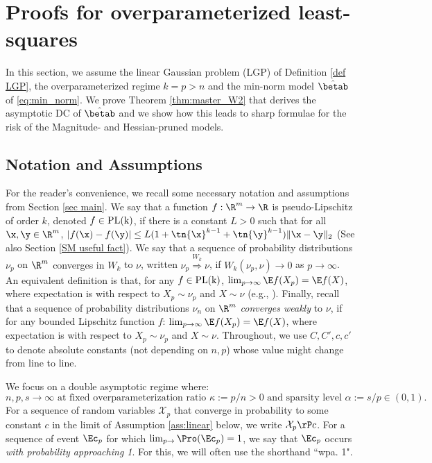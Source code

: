 
\section{Proofs for overparameterized least-squares}\label{sec proof thm 1}
In this section, we assume the linear Gaussian problem (LGP) of Definition \ref{def LGP}, the overparameterized regime $k=p>n$ and the min-norm model $\hat\betab$ of \eqref{eq:min_norm}. We prove Theorem \ref{thm:master_W2} that derives the asymptotic DC of $\hat\betab$ and we show how this leads to sharp formulae for the risk of the Magnitude- and Hessian-pruned models.


\subsection{Notation and Assumptions}\label{sec:ass_app}
For the reader's convenience, we recall some necessary notation and assumptions from Section \ref{sec main}.  We say that a function $f:\R^m\rightarrow\R$ is pseudo-Lipschitz of order $k$, denoted $f\in\rm{PL}(k)$, if there is a constant $L>0$ such that for all $\x,\y\in\R^m$,
$
|f(\x) - f(\y)|\leq L(1+\tn{\x}^{k-1}+\tn{\y}^{k-1})\|\x-\y\|_2 
$
(See also Section \ref{SM useful fact}). 
We say that a sequence of probability distributions $\nu_p$ on $\R^m$ {converges in $W_k$} to 
$\nu$, written $\nu_p\stackrel{W_k}{\Longrightarrow} \nu$, if $W_k(\nu_p,\nu) \rightarrow 0$ as $p \rightarrow \infty$. An equivalent definition is that, for any $f\in\rm{PL}(k)$, $\lim_{p\rightarrow\infty}\E f(X_p)=\E f(X)$, where expectation is with respect to $X_p\sim\nu_p$ and $X\sim\nu$ (e.g., \cite{montanari2017estimation}).  
%
Finally, recall that a sequence of probability distributions $\nu_n$ on $\R^m$ \emph{converges weakly} to $\nu$, if for any bounded Lipschitz function $f$: $\lim_{p\rightarrow\infty}\E f(X_p)=\E f(X)$, where expectation is with respect to $X_p\sim\nu_p$ and $X\sim\nu$.
%
Throughout, we use $C,C',c,c'$ to denote absolute constants (not depending on $n,p$) whose value might change from line to line. 


We focus on a double asymptotic regime where:
$$n,p,s\rightarrow\infty \text{ at fixed overparameterization ratio } \kappa:=p/n>0 \text{ and sparsity level } \alpha:=s/p\in(0,1).$$  
%
For a sequence of random variables $\mathcal{X}_{p}$ that converge in probability to some constant $c$ in the limit of Assumption \ref{ass:linear} below, we  write $\mathcal{X}_{p}\rP c$. For a sequence of event $\Ec_p$ for which $\lim_{p\rightarrow}\Pro(\Ec_p) = 1$, we say that $\Ec_p$ occurs \emph{with probability approaching 1}. For this, we will often use the shorthand ``wpa. 1".


